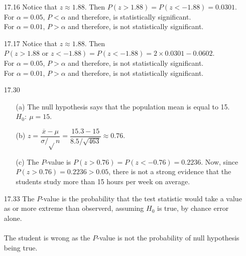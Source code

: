 \documentclass[11pt, a4paper]{article}
\begin{document}
\begin{itemize}
\item[17.16]
Notice that $z \approx 1.88$. Then $P(z > 1.88) = P(z < -1.88) = 0.0301$.\\
For $\alpha = 0.05$, $P < \alpha$ and therefore, is statistically significant.\\
For $\alpha = 0.01$, $P > \alpha$ and therefore, is not statistically significant.

\item[]
\item[]

\item[17.17]
Notice that $z \approx 1.88$. Then $P(z > 1.88 \text{ or } z < -1.88) = P(z < -1.88) = 2 \times 0.0301 - 0.0602$.\\
For $\alpha = 0.05$, $P > \alpha$ and therefore, is not statistically significant.\\
For $\alpha = 0.01$, $P > \alpha$ and therefore, is not statistically significant.

\newpage

\item[17.30]
\begin{itemize}
\item[(a)]
The null hypothesis says that the population mean is equal to 15.
$H_0: \ \mu = 15$.

\item[]

\item[(b)]
$z = \displaystyle\dfrac{\overline{x} - \mu}{\sigma/\sqrt{}n} = \displaystyle\dfrac{15.3 - 15}{8.5/\sqrt{463}} \approx 0.76$.

\item[]

\item[(c)]
The $P$-value is $P(z > 0.76) = P(z < -0.76) = 0.2236$.
Now, since $P(z > 0.76) = 0.2236 > 0.05$, there is not
a strong evidence that the students study more than
15 hours per week on average.
\end{itemize}

\item[]
\item[]

\item[17.33]
The $P$-value is the probability that the test statistic
would take a value as or more extreme than observerd, assuming
$H_0$ is true, by chance error alone.\\\\
The student is wrong as the $P$-value is not the probability
of null hypothesis being true.


\end{itemize}
\end{document}
